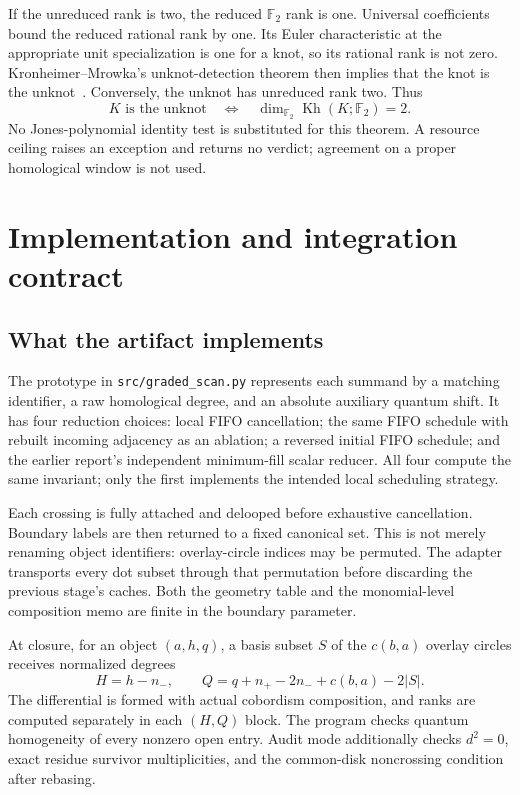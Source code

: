 \documentclass[11pt,letterpaper]{article}
\theoremstyle{remark}\newtheorem{remark}[theorem]{Remark}
\newcommand{\F}{\mathbb F}
\newcommand{\Kh}{\operatorname{Kh}}
\begin{document}
If the unreduced rank is two, the reduced $\F_2$ rank is one. Universal coefficients bound the reduced rational rank by one. Its Euler characteristic at the appropriate unit specialization is one for a knot, so its rational rank is not zero. Kronheimer--Mrowka's unknot-detection theorem then implies that the knot is the unknot~\cite{KM}. Conversely, the unknot has unreduced rank two. Thus
\[
 K\text{ is the unknot}\quad\Longleftrightarrow\quad
 \dim_{\F_2}\Kh(K;\F_2)=2.
\]
No Jones-polynomial identity test is substituted for this theorem. A resource ceiling raises an exception and returns no verdict; agreement on a proper homological window is not used.

\section{Implementation and integration contract}\label{sec:integration}
\subsection{What the artifact implements}
The prototype in \texttt{src/graded\_scan.py} represents each summand by a matching identifier, a raw homological degree, and an absolute auxiliary quantum shift. It has four reduction choices: local FIFO cancellation; the same FIFO schedule with rebuilt incoming adjacency as an ablation; a reversed initial FIFO schedule; and the earlier report's independent minimum-fill scalar reducer. All four compute the same invariant; only the first implements the intended local scheduling strategy.

Each crossing is fully attached and delooped before exhaustive cancellation. Boundary labels are then returned to a fixed canonical set. This is not merely renaming object identifiers: overlay-circle indices may be permuted. The adapter transports every dot subset through that permutation before discarding the previous stage's caches. Both the geometry table and the monomial-level composition memo are finite in the boundary parameter.

At closure, for an object $(a,h,q)$, a basis subset $S$ of the $c(b,a)$ overlay circles receives normalized degrees
\begin{equation}\label{eq:closuregrading}
 H=h-n_-,\qquad Q=q+n_+-2n_-+c(b,a)-2|S|.
\end{equation}
The differential is formed with actual cobordism composition, and ranks are computed separately in each $(H,Q)$ block. The program checks quantum homogeneity of every nonzero open entry. Audit mode additionally checks $d^2=0$, exact residue survivor multiplicities, and the common-disk noncrossing condition after rebasing.
\end{document}
